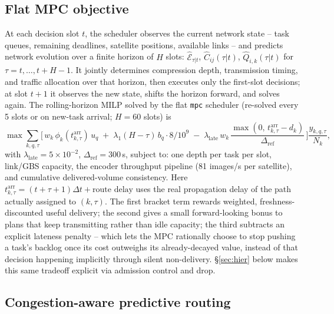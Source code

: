 \subsection{Flat MPC objective}
\label{sec:flat-mpc}

At each decision slot $t$, the scheduler observes the current network state -- task queues, remaining deadlines, satellite positions, available links -- and predicts network evolution over a finite horizon of $H$ slots: $\hat{\mathcal{E}}_{\tau|t}$, $\hat C_{ij}(\tau|t)$, $\hat Q_{i,k}(\tau|t)$ for $\tau = t, \ldots, t+H-1$. It jointly determines compression depth, transmission timing, and traffic allocation over that horizon, then executes only the first-slot decisions; at slot $t+1$ it observes the new state, shifts the horizon forward, and solves again. The rolling-horizon MILP solved by the flat \texttt{mpc} scheduler (re-solved every 5 slots or on new-task arrival; $H = 60$ slots) is
\begin{equation}
\max \sum_{k,q,\tau} \Big[\, w_k\, \phi_k(t^{\mathrm{arr}}_{k,\tau})\, u_q
  \;+\; \lambda_1 (H-\tau)\, b_q \cdot 8 / 10^9
  \;-\; \lambda_{\mathrm{late}}\, w_k\,
    \frac{\max(0,\, t^{\mathrm{arr}}_{k,\tau} - d_k)}{\Delta_{\mathrm{ref}}}
  \,\Big] \frac{y_{k,q,\tau}}{N_k},
\end{equation}
with $\lambda_{\mathrm{late}} = 5\times10^{-2}$, $\Delta_{\mathrm{ref}} = 300$\,s, subject to: one depth per task per slot, link/GBS capacity, the encoder throughput pipeline (81 images/s per satellite), and cumulative delivered-volume consistency. Here $t^{\mathrm{arr}}_{k,\tau} = (t+\tau+1)\Delta t + \text{route delay}$ uses the real propagation delay of the path actually assigned to $(k,\tau)$. The first bracket term rewards weighted, freshness-discounted useful delivery; the second gives a small forward-looking bonus to plans that keep transmitting rather than idle capacity; the third subtracts an explicit lateness penalty -- which lets the MPC rationally choose to stop pushing a task's backlog once its cost outweighs its already-decayed value, instead of that decision happening implicitly through silent non-delivery. \S\ref{sec:hier} below makes this same tradeoff explicit via admission control and drop.

\subsection{Congestion-aware predictive routing}
\label{sec:congestion-routing}

